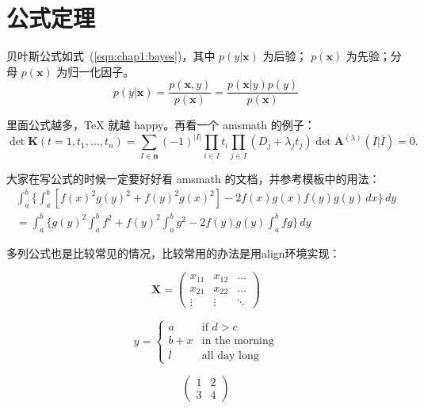 \section{公式定理}
\label{sec:equation}
贝叶斯公式如式~(\ref{equ:chap1:bayes})，其中 $p(y|\mathbf{x})$ 为后验；
$p(\mathbf{x})$ 为先验；分母 $p(\mathbf{x})$ 为归一化因子。
\begin{equation}
\label{equ:chap1:bayes}
p(y|\mathbf{x}) = \frac{p(\mathbf{x},y)}{p(\mathbf{x})}=
\frac{p(\mathbf{x}|y)p(y)}{p(\mathbf{x})} 
\end{equation}

里面公式越多，\TeX{} 就越 happy。再看一个 \textsf{amsmath} 的例子：
\newcommand{\envert}[1]{\left\lvert#1\right\rvert} 
\begin{equation}\label{detK2}
\det\mathbf{K}(t=1,t_1,\dots,t_n)=\sum_{I\in\mathbf{n}}(-1)^{\envert{I}}
\prod_{i\in I}t_i\prod_{j\in I}(D_j+\lambda_jt_j)\det\mathbf{A}
^{(\lambda)}(\overline{I}|\overline{I})=0.
\end{equation} 

大家在写公式的时候一定要好好看 \textsf{amsmath} 的文档，并参考模板中的用法：
\begin{multline*}%
\int_a^b\biggl\{\int_a^b[f(x)^2g(y)^2+f(y)^2g(x)^2]
 -2f(x)g(x)f(y)g(y)\,dx\biggr\}\,dy \\
 =\int_a^b\biggl\{g(y)^2\int_a^bf^2+f(y)^2
  \int_a^b g^2-2f(y)g(y)\int_a^b fg\biggr\}\,dy
\end{multline*}

多列公式也是比较常见的情况，比较常用的办法是用align环境实现：

\begin{equation} 
\mathbf{X} = \left(\begin{array}{ccc} 
x_{11} & x_{12} & \ldots \\ 
x_{21} & x_{22} & \ldots \\ 
\vdots & \vdots & \ddots \end{array} \right) 
\end{equation} 

\begin{equation} 
y = \left\{ \begin{array}{ll} 
a & \textrm{if $d>c$}\\ 
b+x & \textrm{in the morning}\\ 
l & \textrm{all day long} 
\end{array} \right. 
\end{equation} 

\begin{equation} 
\left(\begin{array}{c|c} 
1 & 2 \\ 
\hline 3 & 4 \end{array}\right) 
\end{equation}   

